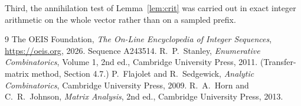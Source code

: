 \documentclass[11pt,a4paper]{article}
\theoremstyle{plain}
\theoremstyle{definition}
\begin{document}
Third, the annihilation test of Lemma~\ref{lem:crit} was carried out in exact integer
arithmetic on the whole vector rather than on a sampled prefix.

\begin{thebibliography}{9}
 The OEIS Foundation, \emph{The On-Line Encyclopedia of Integer
Sequences}, \url{https://oeis.org}, 2026. Sequence A243514.
 R.~P.~Stanley, \emph{Enumerative Combinatorics}, Volume 1, 2nd ed.,
Cambridge University Press, 2011. (Transfer-matrix method, Section 4.7.)
 P.~Flajolet and R.~Sedgewick, \emph{Analytic Combinatorics}, Cambridge
University Press, 2009.
 R.~A.~Horn and C.~R.~Johnson, \emph{Matrix Analysis}, 2nd ed., Cambridge
University Press, 2013.
\end{thebibliography}
\end{document}
